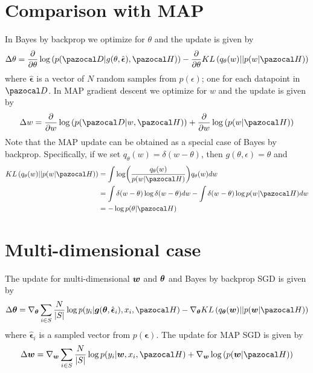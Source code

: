 \section{Comparison with MAP}
In Bayes by backprop we optimize for $\theta$ and the update is given by
\begin{equation}
\Delta \theta = \frac{\partial}{\partial \theta}\log\left(p(\cD|g(\theta, \hat{\boldsymbol{\epsilon}}),\cH)\right) - \frac{\partial}{\partial \theta} KL\left(q_{\theta}(w)||p(w|\cH)\right)
\end{equation}
where $\hat{\boldsymbol{\epsilon}}$ is a vector of $N$ random samples from $p(\epsilon)$; one for each datapoint in $\cD$. 
In MAP gradient descent we optimize for $w$ and the update is given by
\begin{equation}
	\Delta w = \frac{\partial}{\partial w}\log\left(p(\cD|w,\cH)\right) + \frac{\partial}{\partial w}\log\left(p(w|\cH)\right)
\end{equation}
Note that the MAP update can be obtained as a special case of Bayes by backprop. 
Specifically, if we set $q_{\theta}(w) = \delta(w-\theta)$, then $g(\theta,\epsilon) = \theta$ and 
\begin{equation} \label{}
\begin{split}
KL\left(q_{\theta}(w)||p(w|\cH)\right) &= \int \log(\frac{q_{\theta}(w)}{p(w|\cH)})q_{\theta}(w) dw\\
& = \int \delta(w-\theta) \log \delta(w-\theta)dw - \int \delta(w-\theta) \log p(w|\cH)dw \\
& = -\log p(\theta |\cH)
\end{split}
\end{equation}

\section{Multi-dimensional case}
The update for multi-dimensional $\boldsymbol{w}$ and $\boldsymbol{\theta}$ and Bayes by backprop SGD is given by
\begin{equation}\label{}
\Delta \bth=  \nabla_{\bth} \sum_{i\in S}^{} \frac{N}{|S|}\log p(y_i|\boldsymbol{g}(\bth, \hat{\boldsymbol{\epsilon}}_i),x_i,\cH) - \nabla_{\bth} KL\left(q_{\bth}(\bw)||p(\bw|\cH)\right)
\end{equation}
where $\hat{\boldsymbol{\epsilon}}_i$ is a sampled vector from $p(\boldsymbol{\epsilon})$.
The update for MAP SGD is given by
\begin{equation}\label{update_map}
\Delta \bw=  \nabla_{\bw} \sum_{i\in S}^{} \frac{N}{|S|}\log p(y_i|\bw,x_i,\cH) + \nabla_{\bw} \log\left(p(\bw|\cH)\right)
\end{equation}

